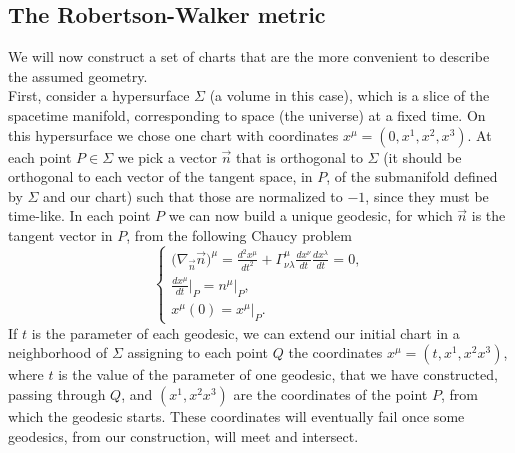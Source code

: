 \subsection{The Robertson-Walker metric}
We will now construct a set of charts that are the more convenient to describe the assumed geometry.\\
First, consider a hypersurface $\Sigma$ (a volume in this case), which is a slice of the spacetime manifold, corresponding to space (the universe) at a fixed time. On this hypersurface we chose one chart with coordinates $x^\mu=(0,x^1,x^2,x^3)$. At each point $P\in\Sigma$ we pick a vector $\vec n$ that is orthogonal to $\Sigma$ (it should be orthogonal to each vector of the tangent space, in $P$, of the submanifold defined by $\Sigma$ and our chart) such that those are normalized to $-1$, since they must be time-like. In each point $P$ we can now build a unique geodesic, for which $\vec n$ is the tangent vector in $P$, from the following Chaucy problem
\begin{equation}\label{Chaucy problem}
    \begin{cases}
        \big(\nabla_{\vec n}\vec n\big)^\mu=\frac{d^2x^\mu}{dt^2}+\Gamma_{\nu\lambda}^{\mu}\frac{dx^\nu}{dt}\frac{dx^\lambda}{dt}=0,\\\frac{dx^\mu}{dt}\big|_{P}=n^\mu\big|_P,\\x^\mu(0)=x^\mu\big|_P.
    \end{cases}
\end{equation}
If $t$ is the parameter of each geodesic, we can extend our initial chart in a neighborhood of $\Sigma$ assigning to each point $Q$ the coordinates $x^\mu=(t,x^1,x^2x^3)$, where $t$ is the value of the parameter of one geodesic, that we have constructed, passing through $Q$, and $(x^1,x^2x^3)$ are the coordinates of the point $P$, from which the geodesic starts. These coordinates will eventually fail once some geodesics, from our construction, will meet and intersect.\\

